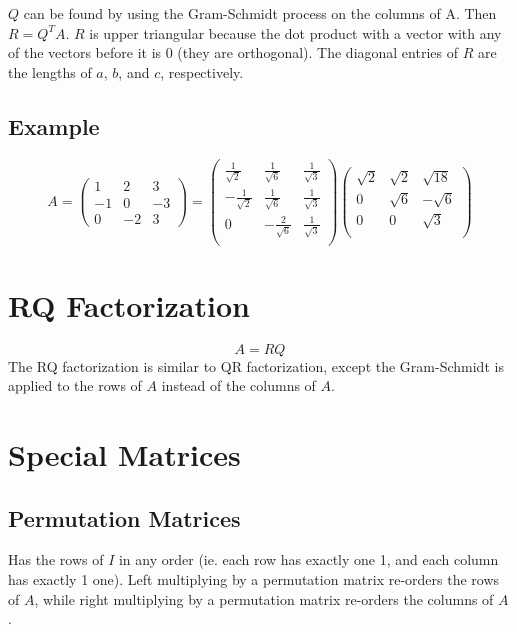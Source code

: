 \documentclass[12pt]{article}
\begin{document}
$Q$ can be found by using the Gram-Schmidt process on the columns of A.  Then $R = Q^T A$. $R$ is upper triangular because the dot product with a vector with any of the vectors before it is 0 (they are orthogonal). The diagonal entries of $R$ are the lengths of $a$, $b$, and $c$, respectively.

\subsection{Example}
\begin{equation*}
A = 
\begin{pmatrix}
1 & 2 & 3\\
-1 & 0 & -3\\
0 & -2 & 3
\end{pmatrix}
=
\begin{pmatrix}
\frac{1}{\sqrt{2}} & \frac{1}{\sqrt{6}} & \frac{1}{\sqrt{3}}\\
-\frac{1}{\sqrt{2}} & \frac{1}{\sqrt{6}} & \frac{1}{\sqrt{3}}\\
0 & -\frac{2}{\sqrt{6}} & \frac{1}{\sqrt{3}}\\
\end{pmatrix}
\begin{pmatrix}
\sqrt{2} & \sqrt{2} & \sqrt{18}\\
0 & \sqrt{6} & -\sqrt{6}\\
0 & 0 & \sqrt{3}\\
\end{pmatrix}
\end{equation*}

\section{RQ Factorization}
\begin{equation*}
A = RQ
\end{equation*}
The RQ factorization is similar to QR factorization, except the Gram-Schmidt is applied to the rows of $A$ instead of the columns of $A$.

\section{Special Matrices}
\subsection{Permutation Matrices}
Has the rows of $I$ in any order (ie. each row has exactly one 1, and each column has exactly 1 one). Left multiplying by a permutation matrix re-orders the rows of $A$, while right multiplying by a permutation matrix re-orders the columns of $A$.
\end{document}
